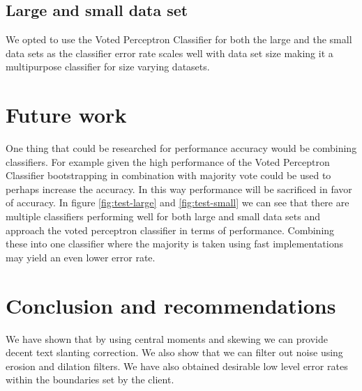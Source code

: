 \documentclass[%
        compressed,
        final,
        notitlepage,
        narroweqnarray,
        inline,
        twoside,
        ]{ieee}
\begin{document}
\subsection{Large and small data set}
We opted to use the Voted Perceptron Classifier for both the large and the small data sets as the classifier error rate scales well with data set size making it a multipurpose classifier for size varying datasets.

\section{Future work}
One thing that could be researched for performance accuracy would be combining
classifiers. For example given the high performance of the Voted Perceptron
Classifier bootstrapping in combination with majority vote could be used to
perhaps increase the accuracy. In this way performance will be sacrificed in
favor of accuracy. In figure \ref{fig:test-large}
and \ref{fig:test-small} we can see that there are multiple
classifiers performing well for both large and small data sets and approach the
voted perceptron classifier in terms of performance. Combining these into one
classifier where the majority is taken using fast implementations may yield an
even lower error rate. %

\section{Conclusion and recommendations}
We have shown that by using central moments and skewing we can provide decent
text slanting correction. We also show that we can filter out noise using
erosion and dilation filters. We have also obtained desirable low level error
rates within the boundaries set by the client.
\end{document}
